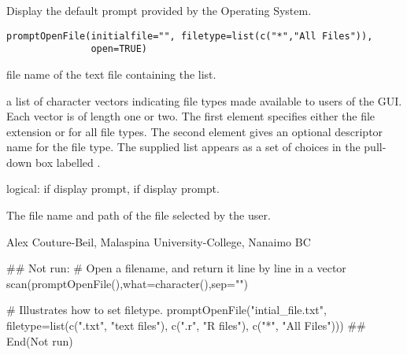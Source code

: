 \documentclass[letterpaper]{book}
\begin{document}
\begin{Description}\relax
Display the default  prompt provided by the Operating System.
\end{Description}
\begin{Usage}
\begin{verbatim}
promptOpenFile(initialfile="", filetype=list(c("*","All Files")), 
               open=TRUE)
\end{verbatim}
\end{Usage}
\begin{Arguments}
\begin{ldescription}
\item[\code{initialfile}] file name of the text file containing the list.
\item[\code{filetype}] a list of character vectors indicating file types made available 
to users of the GUI. Each vector is of length one or two. The first element 
specifies either the file extension or  for all file types. The second 
element gives an optional descriptor name for the file type. The supplied 
 list appears as a set of choices in the pull-down box labelled 
.
\item[\code{open}] logical: if  display  prompt, 
if  display  prompt.
\end{ldescription}
\end{Arguments}
\begin{Value}
The file name and path of the file selected by the user.
\end{Value}
\begin{Author}\relax
Alex Couture-Beil, Malaspina University-College, Nanaimo BC
\end{Author}
\begin{SeeAlso}\relax
{}
\end{SeeAlso}
\begin{Examples}
\begin{ExampleCode}
## Not run: 
# Open a filename, and return it line by line in a vector
scan(promptOpenFile(),what=character(),sep="\n")

# Illustrates how to set filetype.
promptOpenFile("intial_file.txt", filetype=list(c(".txt", "text files"), 
               c(".r", "R files"), c("*", "All Files")))
## End(Not run)
\end{ExampleCode}
\end{Examples}
\end{document}
